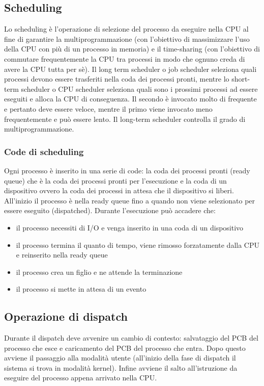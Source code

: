 \subsection{Scheduling}
Lo scheduling \`e l'operazione di selezione del processo da eseguire nella CPU al fine di garantire la multiprogrammazione (con l'obiettivo di massimizzare l'uso della CPU con pi\`u di
un processo in memoria) e il time-sharing (con l'obiettivo di commutare frequentemente la CPU tra processi in modo che ognuno creda di avere la CPU tutta per s\`e). Il long term
scheduler o job scheduler seleziona quali processi devono essere trasferiti nella coda dei processi pronti, mentre lo short-term scheduler o CPU scheduler seleziona quali sono i 
prossimi processi ad essere eseguiti e alloca la CPU di conseguenza. Il secondo \`e invocato molto di frequente e pertanto deve essere veloce, mentre il primo viene invocato meno
frequentemente e pu\`o essere lento. Il long-term scheduler controlla il grado di multiprogrammazione. 
\subsubsection{Code di scheduling}
Ogni processo \`e inserito in una serie di code: la coda dei processi pronti (ready queue) che \`e la coda dei processi pronti per l'esecuzione e la coda di un dispositivo ovvero la
coda dei processi in attesa che il dispositivo si liberi. All'inizio il processo \`e nella ready queue fino a quando non viene selezionato per essere eseguito (dispatched). Durante
l'esecuzione pu\`o accadere che:
\begin{itemize}
	\item il processo necessiti di I/O e venga inserito in una coda di un dispositivo
	\item il processo termina il quanto di tempo, viene rimosso forzatamente dalla CPU e reinserito nella ready queue
	\item il processo crea un figlio e ne attende la terminazione
	\item il processo si mette in attesa di un evento
\end{itemize}
\subsection{Operazione di dispatch}
Durante il dispatch deve avvenire un cambio di contesto: salvataggio del PCB del processo che esce e caricamento del PCB del processo che entra. Dopo questo avviene il passaggio alla
modalit\`a utente (all'inizio della fase di dispatch il sistema si trova in modalit\`a kernel). Infine avviene il salto all'istruzione da eseguire del processo appena arrivato nella
CPU.
